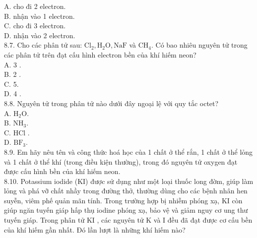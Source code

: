 \documentclass[10pt]{article}
\begin{document}
A. cho đi 2 electron.\\
B. nhận vào 1 electron.\\
C. cho đi 3 electron.\\
D. nhận vào 2 electron.\\
8.7. Cho các phân tử sau: $\mathrm{Cl}_{2}, \mathrm{H}_{2} \mathrm{O}, \mathrm{NaF}$ và $\mathrm{CH}_{4}$. Có bao nhiêu nguyên tử trong các phân tử trên đạt cấu hình electron bền của khí hiếm neon?\\
A. 3 .\\
B. 2 .\\
C. 5.\\
D. 4 .\\
8.8. Nguyên tử trong phân tử nào dưới đây ngoại lệ với quy tắc octet?\\
A. $\mathrm{H}_{2} \mathrm{O}$.\\
B. $\mathrm{NH}_{3}$.\\
C. HCl .\\
D. $\mathrm{BF}_{3}$.\\
8.9. Em hãy nêu tên và công thức hoá học của 1 chất ở thể rắn, 1 chất ở thể lỏng và 1 chất ở thể khí (trong điều kiện thường), trong đó nguyên tử oxygen đạt được cấu hình bền của khí hiếm neon.\\
8.10. Potassium iodide (KI) được sử dụng như một loại thuốc long đờm, giúp làm lỏng và phá vỡ chất nhầy trong đường thở, thường dùng cho các bệnh nhân hen suyễn, viêm phế quản mãn tính. Trong trường hợp bị nhiễm phóng xạ, KI còn giúp ngăn tuyến giáp hấp thụ iodine phóng xạ, bảo vệ và giảm nguy cơ ung thư tuyến giáp. Trong phân tử KI , các nguyên tử K và I đều đã đạt được cơ cấu bền của khí hiếm gần nhất. Đó lần lượt là những khí hiếm nào?
\end{document}
